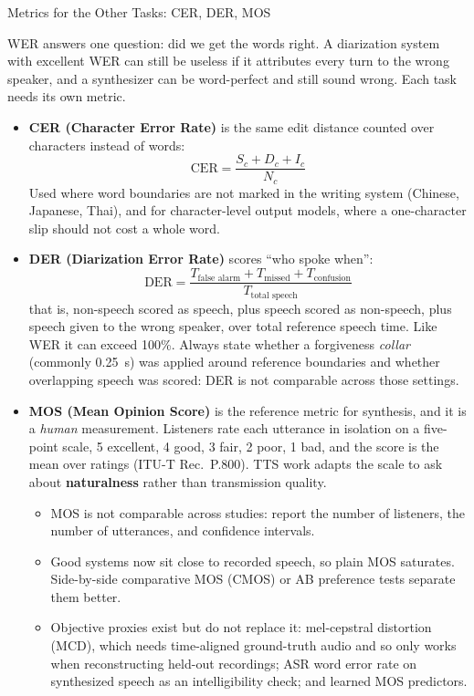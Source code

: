 \begin{frame}[allowframebreaks]{Metrics for the Other Tasks: CER, DER, MOS}

WER answers one question: did we get the words right. A diarization system with excellent WER can still be useless if it attributes every turn to the wrong speaker, and a synthesizer can be word-perfect and still sound wrong. Each task needs its own metric.

\begin{itemize}
    \item \textbf{CER (Character Error Rate)} is the same edit distance counted over characters instead of words:
    \[
        \text{CER} = \frac{S_c + D_c + I_c}{N_c}
    \]
    Used where word boundaries are not marked in the writing system (Chinese, Japanese, Thai), and for character-level output models, where a one-character slip should not cost a whole word.

\framebreak
    \item \textbf{DER (Diarization Error Rate)} scores ``who spoke when'':
    \[
        \text{DER} = \frac{T_{\text{false alarm}} + T_{\text{missed}} + T_{\text{confusion}}}{T_{\text{total speech}}}
    \]
    that is, non-speech scored as speech, plus speech scored as non-speech, plus speech given to the wrong speaker, over total reference speech time. Like WER it can exceed 100\%. Always state whether a forgiveness \emph{collar} (commonly 0.25~s) was applied around reference boundaries and whether overlapping speech was scored: DER is not comparable across those settings.

\framebreak
    \item \textbf{MOS (Mean Opinion Score)} is the reference metric for synthesis, and it is a \emph{human} measurement. Listeners rate each utterance in isolation on a five-point scale, 5 excellent, 4 good, 3 fair, 2 poor, 1 bad, and the score is the mean over ratings (ITU-T Rec.\ P.800). TTS work adapts the scale to ask about \textbf{naturalness} rather than transmission quality.
    \begin{itemize}
        \item MOS is not comparable across studies: report the number of listeners, the number of utterances, and confidence intervals.
        \item Good systems now sit close to recorded speech, so plain MOS saturates. Side-by-side comparative MOS (CMOS) or AB preference tests separate them better.
        \item Objective proxies exist but do not replace it: mel-cepstral distortion (MCD), which needs time-aligned ground-truth audio and so only works when reconstructing held-out recordings; ASR word error rate on synthesized speech as an intelligibility check; and learned MOS predictors.
    \end{itemize}
\end{itemize}

\end{frame}
